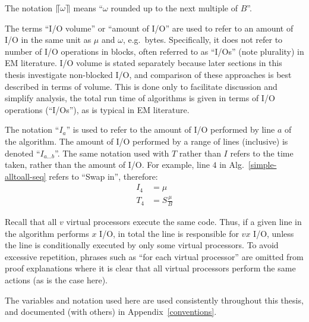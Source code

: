 \documentclass[12pt]{carletoncsthesis}
\begin{document}
The notation $\llceil{\omega}\rrceil$ means ``$\omega$ rounded up to the
next multiple of $B$''.

The terms ``I/O volume'' or ``amount of I/O'' are used to refer to an amount of
I/O in the same unit as $\mu$ and $\omega$, e.g.\ bytes.  Specifically, it does
not refer to number of I/O operations in blocks, often referred to as ``I/Os''
(note plurality) in EM literature.  I/O volume is stated separately because
later sections in this thesis investigate non-blocked I/O, and comparison of
these approaches is best described in terms of volume.  This is done only to
facilitate discussion and simplify analysis, the total run time of algorithms
is given in terms of I/O operations (``I/Os''), as is typical in EM literature.

The notation ``$I_{a}$'' is used to refer to the amount of I/O performed by
line $a$ of the algorithm.  The amount of I/O performed by a range of lines
(inclusive) is denoted ``$I_{a{\dots}b}$''.  The same notation used with $T$
rather than $I$ refers to the time taken, rather than the amount of I/O.
For example, line $4$ in
Alg.~\ref{simple-alltoall-seq} refers to ``Swap in'', therefore:
\begin{align*}
I_{4} &= \mu \\
T_{4} &= S\frac{\mu}{B}
\end{align*}

Recall that all $v$ virtual processors execute the same code.  Thus,
if a given line in the algorithm performs $x$ I/O, in total the line is
responsible for $vx$ I/O, unless the line is conditionally executed by only
some virtual processors.  To avoid excessive repetition, phrases such as ``for
each virtual processor'' are omitted from proof explanations where it is clear
that all virtual processors perform the same actions (as is the case here).

The variables and notation used here are used consistently throughout this
thesis, and documented (with others) in Appendix~\ref{conventions}.
\end{document}
